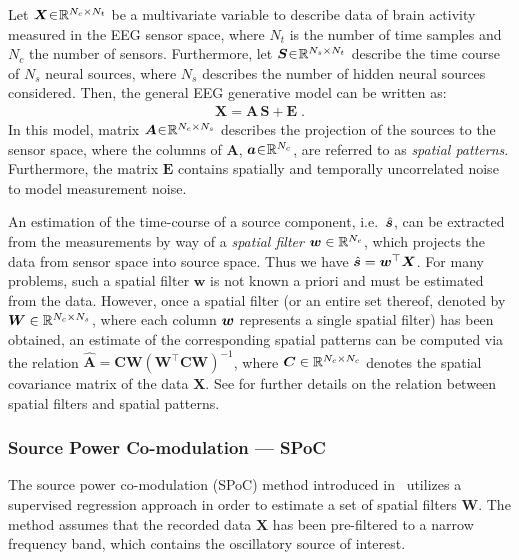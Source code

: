 \documentclass[10pt,a4paper]{article}
\providecommand{\mat}[1]{{\bm {#1}}}
\begin{document}
Let $\mat{X}\negmedspace\in\negmedspace \Real^{N_c \times N_t}$ be a multivariate variable to describe data of brain activity measured in the EEG sensor space, where $N_t$ is the number of time samples and $N_c$ the number of sensors. Furthermore, let $\mat{S} \negmedspace\in\negmedspace \Real^{N_s \times N_t}$ describe the time course of $N_s$ neural sources, where $N_s$ describes the number of hidden neural sources considered. Then, the general EEG generative model can be written as: 
\begin{align}\label{eq:genModel}
\mat{X}=\mat{A}\,\mat{S} + \mat{E} \;.
\end{align} 
In this model, matrix $\mat{A}\negmedspace\in\negmedspace \Real^{N_c \times N_s}$ describes the projection of the sources to the sensor space, where the columns of $\mat{A}$, ${\bm {a}} \negmedspace\in\negmedspace \mathbb{R}^{N_c}$, are referred to as \emph{spatial patterns}. Furthermore, the matrix $\mat{E}$ contains spatially and temporally uncorrelated noise to model measurement noise. 

An estimation of the time-course of a source component, i.e.\ $\hat{{\bm {s}}}$, can be extracted from the measurements by way of a \emph{spatial filter} ${\bm {w}} \in \mathbb{R}^{N_c}$, which projects the data from sensor space into source space. Thus we have $\hat{\ve{s}} = \ve{w}^\top\mat{X}$.
For many problems, such a spatial filter $\mat{w}$ is not known a priori and must be estimated from the data. However, once a spatial filter (or an entire set thereof, denoted by $\mat{W} \in \Real^{N_c \times N_s}$, where each column ${\bm {w}}$ represents a single spatial filter) has been obtained, an estimate of the corresponding spatial patterns can be computed via the relation $ \hat{\mat{A}} = \mat{C} \mat{W} \left( \mat{W}^\top \mat{C} \mat{W} \right)^{-1} $, where $\mat{C} \in  \Real^{N_c \times N_c} $ denotes the spatial covariance matrix of the data $\mat{X}$. See \cite{haufe2014interpretation} for further details on the relation between spatial filters and spatial patterns.  


\subsubsection{Source Power Co-modulation --- SPoC}
\label{par:spoc}
The source power co-modulation (SPoC) method introduced in~\cite{dahne2014spoc} utilizes a supervised regression approach in order to estimate a set of spatial filters $\mat{W}$. The method assumes that the recorded data $\mat{X}$ has been pre-filtered to a narrow frequency band, which contains the oscillatory source of interest. 
\end{document}
